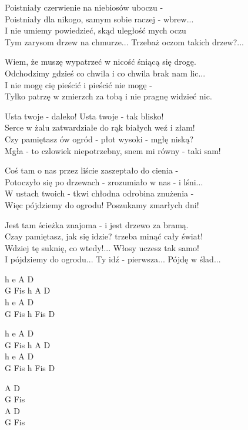 \begin{text}
    \begin{footTwo}
    Poistniały czerwienie na niebiosów uboczu -\\
    Poistniały dla nikogo, samym sobie raczej - wbrew...\\
    I nie umiemy powiedzieć, skąd uległość mych oczu\\
    Tym zarysom drzew na chmurze... Trzebaż oczom takich drzew?...

    Wiem, że muszę wypatrzeć w nicość śniącą się drogę.\\
    Odchodzimy gdzieś co chwila i co chwila brak nam lic...\\
    I nie mogę cię pieścić i pieścić nie mogę -\\
    Tylko patrzę w zmierzch za tobą i nie pragnę widzieć nic.

    \vin Usta twoje - daleko! Usta twoje - tak blisko!\\
    \vin Serce w żalu zatwardziałe do rąk białych weź i złam!\\
    \vin Czy pamiętasz ów ogród - płot wysoki - mgłę niską?\\
    \vin Mgła - to czlowiek niepotrzebny, snem mi równy - taki sam!

    Coś tam o nas przez liście zaszeptało do cienia -\\
    Potoczyło się po drzewach - zrozumiało w nas - i lśni...\\
    W ustach twoich - tkwi chłodna odrobina znużenia -\\
    Więc pójdziemy do ogrodu! Poszukamy zmarłych dni!

    Jest tam ścieżka znajoma - i jest drzewo za bramą.\\
    Czay pamiętasz, jak się idzie? trzeba minąć cały świat!\\
    Wdziej tę suknię, co wtedy!... Włosy uczesz tak samo!\\
    I pójdziemy do ogrodu... Ty idź - pierwsza... Pójdę w ślad...
\end{footTwo}
\end{text}
\begin{chord}
    \begin{footTwo}
    h e A D\\
    G Fis h A D\\
    h e A D\\
    G Fis h Fis D

    h e A D\\
    G Fis h A D\\
    h e A D\\
    G Fis h Fis D

    A D\\
    G Fis\\
    A D\\
    G Fis
\end{footTwo}
\end{chord}